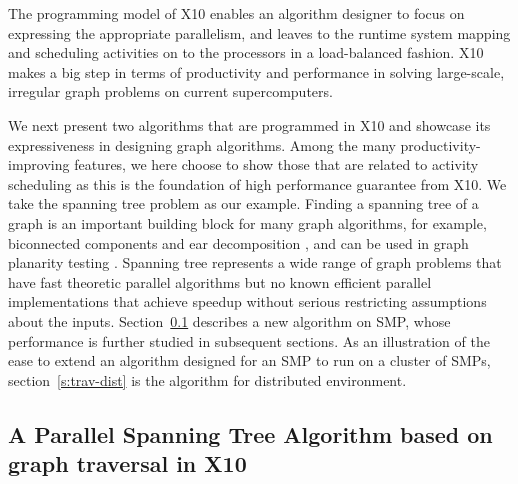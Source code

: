 The programming model of X10 enables an algorithm designer to focus on expressing the appropriate parallelism, and leaves to the runtime system mapping and scheduling activities on to the processors in a load-balanced fashion. X10 makes a big step in terms of productivity and performance in solving large-scale, irregular graph problems on current supercomputers.


 We next present two algorithms that are programmed in X10 and showcase its expressiveness in designing graph algorithms. Among the many productivity-improving features, we here choose to show those that are related to activity scheduling as this is the foundation of high performance guarantee from X10. 
We take the spanning tree problem as our example. Finding a spanning tree of a graph is an important building
block for many graph algorithms, for example, biconnected components
and ear decomposition \cite{MR86}, and can be used in graph planarity testing \cite{KR88}.
Spanning tree represents a wide range of graph problems that have fast
theoretic parallel algorithms but no known efficient
parallel implementations that achieve speedup without serious restricting assumptions about the inputs. 
Section~\ref{s:trav} describes a new algorithm on SMP, whose performance is further studied in subsequent sections.
As an illustration of the ease to extend an algorithm designed for an SMP to run on a cluster of SMPs, section~\ref{s:trav-dist} is the algorithm
for distributed environment. 

 

\subsection{A Parallel Spanning Tree Algorithm based on graph traversal in X10}
\label{s:trav}

